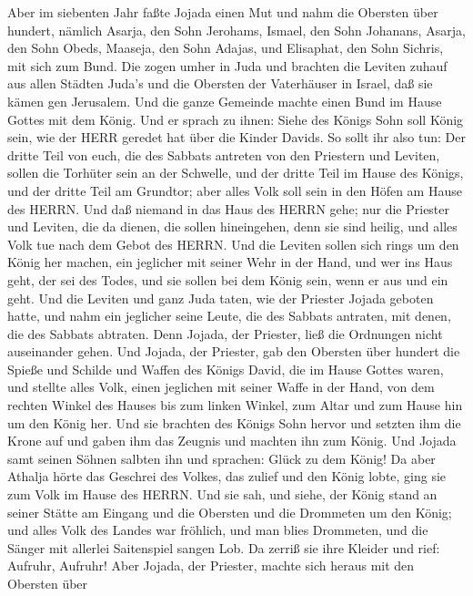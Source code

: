 Aber im siebenten Jahr faßte Jojada einen Mut und nahm die
Obersten über hundert, nämlich Asarja, den Sohn Jerohams, Ismael, den
Sohn Johanans, Asarja, den Sohn Obeds, Maaseja, den Sohn Adajas, und
Elisaphat, den Sohn Sichris, mit sich zum Bund.  Die zogen
umher in Juda und brachten die Leviten zuhauf aus allen Städten Juda's
und die Obersten der Vaterhäuser in Israel, daß sie kämen gen Jerusalem.
 Und die ganze Gemeinde machte einen Bund im Hause Gottes
mit dem König. Und er sprach zu ihnen: Siehe des Königs Sohn soll König
sein, wie der HERR geredet hat über die Kinder Davids.  So
sollt ihr also tun: Der dritte Teil von euch, die des Sabbats antreten
von den Priestern und Leviten, sollen die Torhüter sein an der Schwelle,
 und der dritte Teil im Hause des Königs, und der dritte
Teil am Grundtor; aber alles Volk soll sein in den Höfen am Hause des
HERRN.  Und daß niemand in das Haus des HERRN gehe; nur die
Priester und Leviten, die da dienen, die sollen hineingehen, denn sie
sind heilig, und alles Volk tue nach dem Gebot des HERRN. 
Und die Leviten sollen sich rings um den König her machen, ein jeglicher
mit seiner Wehr in der Hand, und wer ins Haus geht, der sei des Todes,
und sie sollen bei dem König sein, wenn er aus und ein geht.
 Und die Leviten und ganz Juda taten, wie der Priester
Jojada geboten hatte, und nahm ein jeglicher seine Leute, die des
Sabbats antraten, mit denen, die des Sabbats abtraten. Denn Jojada, der
Priester, ließ die Ordnungen nicht auseinander gehen.  Und
Jojada, der Priester, gab den Obersten über hundert die Spieße und
Schilde und Waffen des Königs David, die im Hause Gottes waren,
 und stellte alles Volk, einen jeglichen mit seiner Waffe
in der Hand, von dem rechten Winkel des Hauses bis zum linken Winkel,
zum Altar und zum Hause hin um den König her.  Und sie
brachten des Königs Sohn hervor und setzten ihm die Krone auf und gaben
ihm das Zeugnis und machten ihn zum König. Und Jojada samt seinen Söhnen
salbten ihn und sprachen: Glück zu dem König!  Da aber
Athalja hörte das Geschrei des Volkes, das zulief und den König lobte,
ging sie zum Volk im Hause des HERRN.  Und sie sah, und
siehe, der König stand an seiner Stätte am Eingang und die Obersten und
die Drommeten um den König; und alles Volk des Landes war fröhlich, und
man blies Drommeten, und die Sänger mit allerlei Saitenspiel sangen Lob.
Da zerriß sie ihre Kleider und rief: Aufruhr, Aufruhr! 
Aber Jojada, der Priester, machte sich heraus mit den Obersten über
